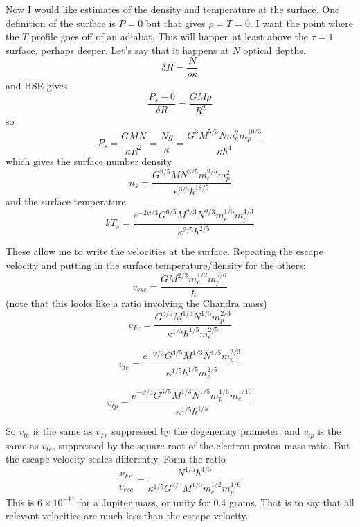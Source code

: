 \documentclass{emulateapj}
\begin{document}
Now I would like estimates of the density and temperature at the
surface.  One definition of the surface is $P=0$ but that gives $\rho
= T = 0$.  I want the point where the $T$ profile goes off of an
adiabat.  This will happen at least above the $\tau=1$ surface,
perhaps deeper.  Let's say that it happens at $N$ optical depths.
\begin{equation}
  \delta R = \frac{N}{\rho \kappa}
\end{equation}
and HSE gives
\begin{equation}
  \frac{P_s - 0}{\delta R} = \frac{G M \rho}{R^2}
\end{equation}
so 
\begin{equation}
  P_s = \frac{G M N}{\kappa R^2} 
  = \frac{N g}{\kappa} 
  = \frac{G^3M^{5/3} N m_e^2 m_p^{10/3}}{\kappa \hbar^4}
\end{equation}
which gives the surface number density
\begin{equation}
  n_s = \frac{G^{9/5} M N^{3/5} m_e^{9/5} m_p^2}{\kappa^{3/5} \hbar^{18/5}}
\end{equation}
and the surface temperature
\begin{equation}
  k T_s = \frac{e^{-2\psi/3} G^{6/5} M^{2/3} N^{2/3} m_e^{1/5} m_p^{4/3}}{\kappa^{2/5}\hbar^{2/5}}
\end{equation}

These allow me to write the velocities at the surface.  Repeating the
escape velocity and putting in the surface temperature/density for the others:
\begin{equation}
  v_{esc} = \frac{G M^{2/3} m_e^{1/2} m_p^{5/6}}{\hbar}
\end{equation}
(note that this looks like a ratio involving the Chandra mass)
\begin{equation}
  v_{Fe} = \frac{G^{3/5} M^{1/3} N^{1/5} m_p^{2/3}}
  {\kappa^{1/5} \hbar^{1/5} m_e^{2/5}}
\end{equation}

\begin{equation}
  v_{te} = \frac{e^{-\psi/3}G^{3/5} M^{1/3} N^{1/5} m_p^{2/3}}
  {\kappa^{1/5} \hbar^{1/5} m_e^{2/5}}
\end{equation}

\begin{equation}
  v_{tp} = \frac{e^{-\psi/3}G^{3/5} M^{1/3} N^{1/5} m_p^{1/6} m_e^{1/10}}
  {\kappa^{1/5} \hbar^{1/5}}
\end{equation}

So $v_{te}$ is the same as $v_{Fe}$ suppressed by the degeneracy
prameter, and $v_{tp}$ is the same as $v_{te}$, suppressed by the
square root of the electron proton mass ratio.  But the escape
velocity scales differently.  Form the ratio
\begin{equation}
  \frac{v_{Fe}}{v_{esc}} = \frac{N^{1/5} \hbar^{4/5}}{\kappa^{1/5}
    G^{2/5} M^{1/3} m_e^{1/2} m_p^{1/6}}
\end{equation}
This is $6 \times 10^{-11}$ for a Jupiter mass, or unity for 0.4
grams.  That is to say that all relevant velocities are much less than
the escape velocity.
\end{document}
